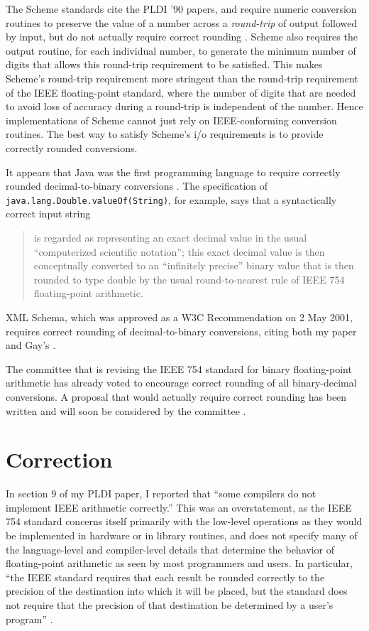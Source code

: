 \documentclass{sigplanconf}
\begin{document}
The Scheme standards cite the PLDI '90 papers, and require
numeric conversion routines to preserve the value of a
number across a \emph{round-trip} of output followed by input,
but do not actually require correct rounding
\cite{IEEE-1178,r5rs}.
Scheme also requires the output routine, for each individual
number, to generate the minimum number of digits that allows
this round-trip requirement to be satisfied.  This makes
Scheme's round-trip requirement more stringent than the
round-trip requirement of the IEEE floating-point standard,
where the number of digits that are needed to avoid loss of
accuracy during a round-trip is independent of the number.
Hence implementations of Scheme cannot just rely on
IEEE-conforming conversion routines.  The best way to
satisfy Scheme's i/o requirements is to provide correctly
rounded conversions.

It appears that Java was the first programming language to
require correctly rounded decimal-to-binary conversions
\cite{java:api}.  The specification of
{\tt java.lang.Double.valueOf(String)}, for example, says
that a syntactically correct input string
\begin{quote}
is regarded as representing an exact decimal value in the
usual ``computerized scientific notation''; this exact
decimal value is then conceptually converted to an
``infinitely precise'' binary value that is then rounded
to type double by the usual round-to-nearest rule of
IEEE 754 floating-point arithmetic.
\end{quote}

XML Schema, which was approved as a W3C Recommendation on
2 May 2001, requires correct rounding of decimal-to-binary
conversions, citing both my paper and Gay's
\cite{Clinger:1990:HRF,Gay:1990,xml-schema}.

The committee that is revising the IEEE 754 standard for
binary floating-point arithmetic has already voted to
encourage correct rounding of all binary-decimal conversions.
A proposal that would actually require correct rounding has
been written and will soon be considered by the committee
\cite{IEEE-754R}.

 
\section{Correction}

In section 9 of my PLDI paper, I reported that ``some compilers
do not implement IEEE arithmetic correctly.''  This was an
overstatement, as the IEEE 754 standard concerns itself
primarily with the low-level operations as they would be
implemented in hardware or in library routines, and does
not specify many of the language-level and compiler-level
details that determine the behavior of floating-point
arithmetic as seen by most programmers and users.  In
particular, ``the IEEE standard requires that each result
be rounded correctly to the precision of the destination
into which it will be placed, but the standard does not
require that the precision of that destination be determined
by a user's program'' \cite{priest-appendixD}.
\end{document}
